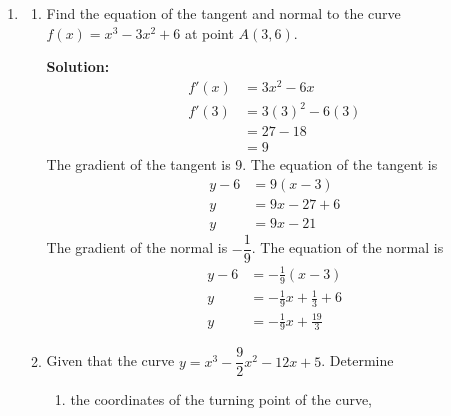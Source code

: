 \documentclass{report}
\newcommand{\sol}{\textbf{Solution:}}
\begin{document}
\begin{enumerate}[leftmargin=*]
\begin{enumerate}
\begin{enumerate}
                              \sol{}
                              \begin{align*}
                                  P(X<26) & = 0.5 - \frac{0.68}{2} \\
                                          & = 0.5 - 0.34           \\
                                          & = 0.16
                              \end{align*}
                    \end{enumerate}
          \end{enumerate}

    \item \begin{enumerate}
              \item Find the equation of the tangent and normal to the curve $f(x)=x^3-3 x^2+6$ at
                    point $A(3,6)$.

                    \sol{}
                    \begin{align*}
                        f'(x) & = 3x^2 - 6x     \\
                        f'(3) & = 3(3)^2 - 6(3) \\
                              & = 27 - 18       \\
                              & = 9
                    \end{align*}
                    The gradient of the tangent is 9. The equation of the tangent is
                    \begin{align*}
                        y-6 & = 9(x-3)  \\
                        y   & = 9x-27+6 \\
                        y   & = 9x-21
                    \end{align*}
                    The gradient of the normal is $-\dfrac{1}{9}$. The equation of the normal is
                    \begin{align*}
                        y-6 & = -\frac{1}{9}(x-3)           \\
                        y   & = -\frac{1}{9}x+\frac{1}{3}+6 \\
                        y   & = -\frac{1}{9}x+\frac{19}{3}
                    \end{align*}

              \item Given that the curve $y=x^3-\dfrac{9}{2} x^2-12 x+5$. Determine
                    \begin{enumerate}
                        \item the coordinates of the turning point of the curve,


\end{enumerate}
\end{enumerate}
\end{enumerate}
\end{document}
